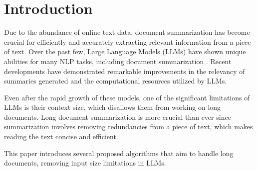 \section{Introduction}
\label{sec:introduction}

Due to the abundance of online text data, document summarization has become crucial
for efficiently and accurately extracting relevant information from a piece of text.
Over the past few, Large Language Models (LLMs) have shown unique abilities for many
NLP tasks, including document summarization \cite{yadav2023state}.
Recent developments have demonstrated remarkable improvements in the relevancy of
summaries generated and the computational resources utilized by LLMs.

Even after the rapid growth of these models, one of the significant limitations of
LLMs is their context size, which disallows them from working on long documents.
Long document summarization is more crucial than ever since summarization involves
removing redundancies from a piece of text, which makes reading the text concise and
efficient.

This paper introduces several proposed algorithms that aim to handle long documents,
removing input size limitations in LLMs.
